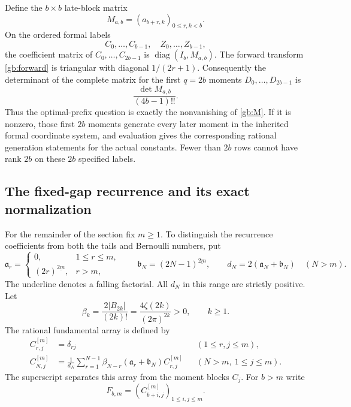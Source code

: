 \documentclass[11pt,a4paper]{article}
\numberwithin{equation}{section}
\theoremstyle{definition}
\theoremstyle{remark}
\begin{document}
Define the $b\times b$ late-block matrix
\begin{equation}\label{gb:M}
 M_{a,b}=(a_{b+r,k})_{0\le r,k<b}.
\end{equation}
On the ordered formal labels
\[
 C_0,\ldots,C_{b-1},\quad Z_0,\ldots,Z_{b-1},
\]
the coefficient matrix of $C_0,\ldots,C_{2b-1}$ is
$\operatorname{diag}(I_b,M_{a,b})$.  The forward transform
\eqref{gb:forward} is triangular with diagonal $1/(2r+1)$.
Consequently the determinant of the complete matrix for the first
$q=2b$ moments $D_0,\ldots,D_{2b-1}$ is
\begin{equation}\label{gb:full-prefix}
             \frac{\det M_{a,b}}{(4b-1)!!}.
\end{equation}
Thus the optimal-prefix question is exactly the nonvanishing of
\eqref{gb:M}.  If it is nonzero, those first $2b$ moments generate
every later moment in the inherited formal coordinate system, and
evaluation gives the corresponding rational generation statements for
the actual constants.  Fewer than $2b$ rows cannot have rank $2b$ on
these $2b$ specified labels.

\subsection{The fixed-gap recurrence and its exact normalization}

For the remainder of the section fix $m\ge1$.  To distinguish the
recurrence coefficients from both the tails and Bernoulli numbers, put
\begin{equation}\label{gb:recurrence-factors}
 \mathfrak a_r=\begin{cases}
 0,&1\le r\le m,\\
 (2r)^{\underline{2m}},&r>m,
 \end{cases}
 \qquad
 \mathfrak b_N=(2N-1)^{\underline{2m}},\qquad
 d_N=2(\mathfrak a_N+\mathfrak b_N)\quad(N>m).
\end{equation}
The underline denotes a falling factorial.  All $d_N$ in this range
are strictly positive.  Let
\begin{equation}\label{gb:beta}
 \beta_k=\frac{2|B_{2k}|}{(2k)!}
        =\frac{4\zeta(2k)}{(2\pi)^{2k}}>0,
 \qquad k\ge1.
\end{equation}
The rational fundamental array is defined by
\begin{align}
 C^{[m]}_{r,j}&=\delta_{rj}&& (1\le r,j\le m),\label{gb:initial}\\
 C^{[m]}_{N,j}&=\frac1{d_N}\sum_{r=1}^{N-1}
   \beta_{N-r}(\mathfrak a_r+\mathfrak b_N)C^{[m]}_{r,j}
       &&(N>m,\ 1\le j\le m).\label{gb:recurrence}
\end{align}
The superscript separates this array from the moment blocks $C_j$.
For $b>m$ write
\begin{equation}\label{gb:F}
                  F_{b,m}=(C^{[m]}_{b+i,j})_{1\le i,j\le m}.
\end{equation}
\end{document}
